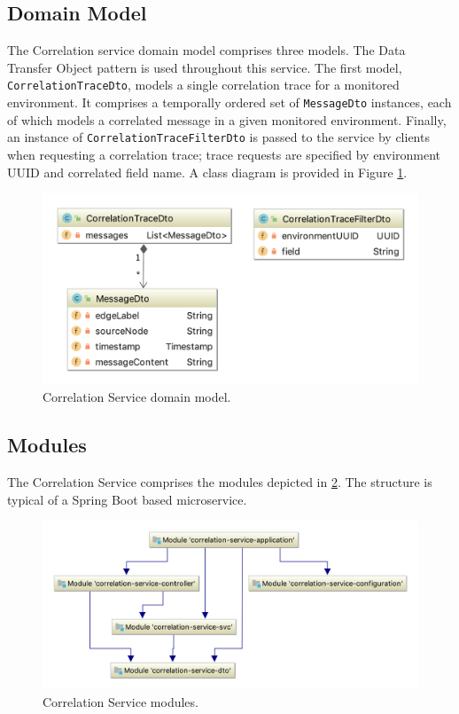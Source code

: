  \subsection{Domain Model} \label{correlation_service_domain_model}
 The Correlation service domain model comprises three models. The Data Transfer Object pattern is used throughout this service. The first model, \texttt{CorrelationTraceDto}, models a single correlation trace for a monitored environment. It comprises a temporally ordered set of  \texttt{MessageDto} instances, each of which models a correlated message in a given monitored environment. Finally, an instance of  \texttt{CorrelationTraceFilterDto} is passed to the service by clients when requesting a correlation trace;  trace requests are specified by environment UUID and correlated field name. A class diagram is provided in Figure \ref{correlation_svc_domain_model}.
 
 \begin{figure}[H]
 	\centering  
 	\includegraphics[scale=1.5] {figures/impl/correlation/domain.png}
 	\caption{Correlation Service domain model.}
 	\label{correlation_svc_domain_model}
 \end{figure}
  
 \subsection{Modules}
 The Correlation Service comprises the modules depicted in \ref{correlation_svc_modules}.  The structure is typical of a Spring Boot based microservice.
 
 \begin{figure}[H]
 	\centering  
 	\includegraphics[width=\linewidth]{figures/impl/correlation/modules.png}
 	\caption{Correlation Service modules.}
 	\label{correlation_svc_modules}
 \end{figure}


